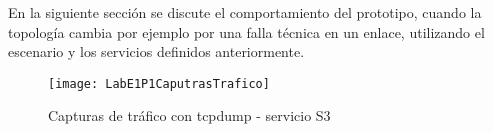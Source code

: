 En la siguiente secci\'on se discute el comportamiento del prototipo, cuando la topolog\'ia cambia por ejemplo por una falla t\'ecnica en un enlace, utilizando el escenario y los servicios definidos anteriormente.

\begin{figure}[ht!] 
\centering    
\texttt{[image: LabE1P1CaputrasTrafico]}
\caption[Capturas de tr\'afico con tcpdump - servicio S3]{Capturas de tr\'afico con tcpdump - servicio S3}
\label{fig:LabE1P1CapsTraf2}
\end{figure}



%
%
%
%
%
%

